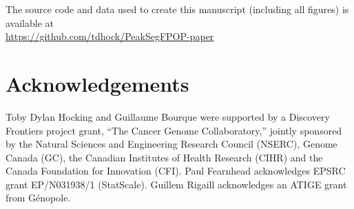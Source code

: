 \documentclass[twoside,11pt]{article}
\begin{document}
The source code and data used to create this manuscript (including all
figures) is available at\\
\url{https://github.com/tdhock/PeakSegFPOP-paper}


\section{Acknowledgements}
  
Toby Dylan Hocking and Guillaume Bourque were supported by a Discovery
Frontiers project grant, ``The Cancer Genome Collaboratory,'' jointly
sponsored by the Natural Sciences and Engineering Research Council
(NSERC), Genome Canada (GC), the Canadian Institutes of Health
Research (CIHR) and the Canada Foundation for Innovation (CFI). Paul
Fearnhead acknowledges EPSRC grant EP/N031938/1 (StatScale).
Guillem Rigaill acknowledges an ATIGE grant from G\'enopole.


 
%

 


\end{document}
